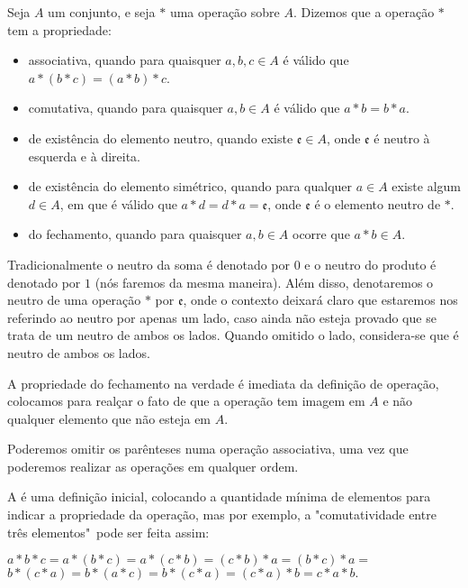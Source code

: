 \documentclass[../main.tex]{subfiles}
\begin{document}
\begin{defi}\label{agb-def-propriedades}
    Seja $A$ um conjunto, e seja $*$ uma operação sobre $A$. Dizemos que a operação $*$ tem a propriedade:
    \begin{itemize}
        \item associativa, quando para quaisquer $a,b,c \in A$ é válido que $ a * ( b * c ) = ( a * b ) * c$.
        \item comutativa, quando para quaisquer $a,b \in A$ é válido que $a * b = b * a$.
        \item de existência do elemento neutro, quando existe $\mathfrak{e} \in A$, onde $\mathfrak{e}$ é neutro à esquerda e à direita.
        \item de existência do elemento simétrico, quando para qualquer $a \in A$ existe algum $d \in A$, em que é válido que $a * d = d * a = \mathfrak{e}$, onde $\mathfrak{e}$ é o elemento neutro de $*$.
        \item do fechamento, quando para quaisquer $a, b \in A$ ocorre que $a * b \in A$.   
    \end{itemize}
\end{defi}
Tradicionalmente o neutro da soma é denotado por $0$ e o neutro do produto é denotado por $1$ (nós faremos da mesma maneira). Além disso, denotaremos o neutro de uma operação $*$ por $\mathfrak{e}$, onde o contexto deixará claro que estaremos nos referindo ao neutro por apenas um lado, caso ainda não esteja provado que se trata de um neutro de ambos os lados. Quando omitido o lado, considera-se que é neutro de ambos os lados.

A propriedade do fechamento na verdade é imediata da definição de operação, colocamos para realçar o fato de que a operação tem imagem em $A$ e não qualquer elemento que não esteja em $A$.

Poderemos omitir os parênteses numa operação associativa, uma vez que poderemos realizar as operações em qualquer ordem.

A  é uma definição inicial, colocando a quantidade mínima de elementos para indicar a propriedade da operação, mas por exemplo, a "comutatividade entre três elementos"\ pode ser feita assim: 
\begin{center}
    $a * b * c = a * (b*c) = a*(c*b) = (c*b)*a = (b*c)*a =$ \\
     $b*(c*a) = b*(a*c) = b*(c*a) =(c*a)*b = c * a * b.$
\end{center}
\end{document}

